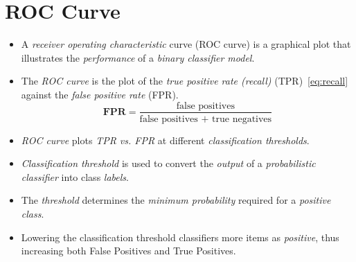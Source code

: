 \documentclass[
	number={3},
	title={Na\"iive Bayes Learning}
]{cs584notes}
\begin{document}
\section{ROC Curve}\label{sec:roc-curve}
\begin{itemize}
	\item A \emph{receiver operating characteristic} curve (ROC curve) is a graphical plot that illustrates the \emph{performance} of a \emph{binary classifier model}.
	\item The \emph{ROC curve} is the plot of the \emph{true positive rate (recall)} (TPR)~\eqref{eq:recall} against the \emph{false positive rate} (FPR).
	\begin{equation}
		\mathbf{FPR} = \frac{\mbox{false positives}}{\mbox{false positives } + \mbox{ true negatives}}
		\label{eq:fpr}
	\end{equation}
	\item \emph{ROC curve} plots \emph{TPR vs. FPR} at different \emph{classification thresholds}.
	\item \emph{Classification threshold} is used to convert the \emph{output} of a \emph{probabilistic classifier} into class \emph{labels}.
	\item The \emph{threshold} determines the \emph{minimum probability} required for a \emph{positive class}.
	\item Lowering the classification threshold classifiers more items as \emph{positive}, thus increasing both False Positives and True Positives.
\end{itemize}
\end{document}
